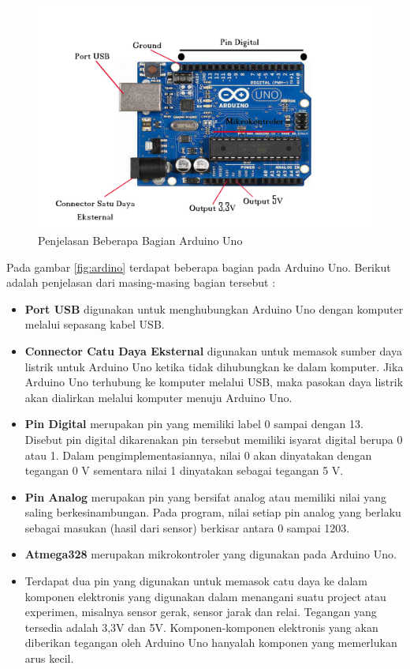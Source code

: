 \begin{figure}[!htbp]
\centering
\includegraphics[width=.75\textwidth]{figures/HRD/arduino.jpg}
\caption{Penjelasan Beberapa Bagian Arduino Uno}\label{fig:arduino}
\end{figure}

Pada gambar \ref{fig:ardino} terdapat beberapa bagian pada Arduino Uno. Berikut adalah penjelasan dari masing-masing bagian tersebut :
\begin{itemize}
\item \textbf{Port USB} digunakan untuk menghubungkan Arduino Uno dengan komputer melalui sepasang kabel USB.
\item \textbf{Connector Catu Daya Eksternal} digunakan untuk memasok sumber daya listrik untuk Arduino Uno ketika tidak dihubungkan ke dalam komputer. Jika Arduino Uno terhubung ke komputer melalui USB, maka pasokan daya listrik akan dialirkan melalui komputer menuju Arduino Uno.
\item \textbf{Pin Digital} merupakan pin yang memiliki label 0 sampai dengan 13. Disebut pin digital dikarenakan pin tersebut memiliki isyarat digital berupa 0 atau 1. Dalam pengimplementasiannya, nilai 0 akan dinyatakan dengan tegangan 0 V sementara nilai 1 dinyatakan sebagai tegangan 5 V.    
\item \textbf{Pin Analog} merupakan pin yang bersifat analog atau memiliki nilai yang saling berkesinambungan. Pada program, nilai setiap pin analog yang berlaku sebagai masukan (hasil dari sensor) berkisar antara 0 sampai 1203.
\item \textbf{Atmega328} merupakan mikrokontroler yang digunakan pada Arduino Uno.
\item Terdapat dua pin yang digunakan untuk memasok catu daya ke dalam komponen elektronis yang digunakan dalam menangani suatu project atau experimen, misalnya sensor gerak, sensor jarak dan relai. Tegangan yang tersedia adalah 3,3V dan 5V. Komponen-komponen elektronis yang akan diberikan tegangan oleh Arduino Uno hanyalah komponen yang memerlukan arus kecil.
\end{itemize}   